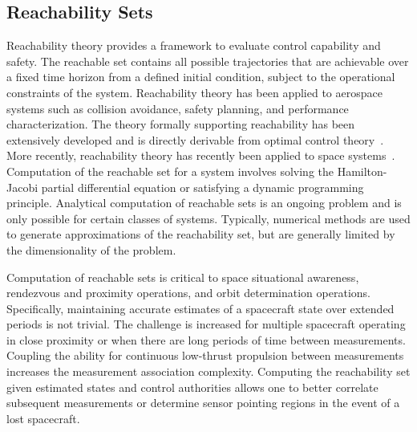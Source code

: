 \subsection{Reachability Sets}\label{sec:reachability_set}
Reachability theory provides a framework to evaluate control capability and safety.  
The reachable set contains all possible trajectories that are achievable over a fixed time horizon from a defined initial condition, subject to the operational constraints of the system.
Reachability theory has been applied to aerospace systems such as collision avoidance, safety planning, and performance characterization.
The theory formally supporting reachability has been extensively developed and is directly derivable from optimal control theory~\cite{varaiya2000,lygeros2002,lygeros2004}.
More recently, reachability theory has recently been applied to space systems~\cite{holzinger2009,komendera2012a,dellnitz2006}.
Computation of the reachable set for a system involves solving the Hamilton-Jacobi partial differential equation or satisfying a dynamic programming principle.
Analytical computation of reachable sets is an ongoing problem and is only possible for certain classes of systems.
Typically, numerical methods are used to generate approximations of the reachability set, but are generally limited by the dimensionality of the problem.
 
Computation of reachable sets is critical to space situational awareness, rendezvous and proximity operations, and orbit determination operations.
Specifically, maintaining accurate estimates of a spacecraft state over extended periods is not trivial.
The challenge is increased for multiple spacecraft operating in close proximity or when there are long periods of time between measurements.
Coupling the ability for continuous low-thrust propulsion between measurements increases the measurement association complexity.
Computing the reachability set given estimated states and control authorities allows one to better correlate subsequent measurements or determine sensor pointing regions in the event of a lost spacecraft. 


